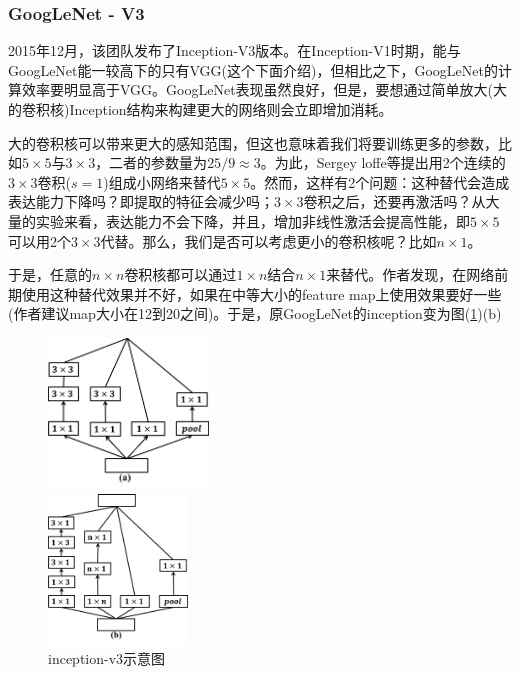        \subsubsection{GoogLeNet - V3}
            \par
            2015年12月，该团队发布了Inception-V3版本\cite{2015.Szegedy}。在Inception-V1时期，能与GoogLeNet能一较高下的只有VGG(这个下面介绍)，但相比之下，GoogLeNet的计算效率要明显高于VGG。GoogLeNet表现虽然良好，但是，要想通过简单放大(大的卷积核)Inception结构来构建更大的网络则会立即增加消耗。
            \par
            大的卷积核可以带来更大的感知范围，但这也意味着我们将要训练更多的参数，比如$5\times 5$与$3\times 3$，二者的参数量为$25/9\approx 3$。为此，Sergey loffe等提出用2个连续的$3\times 3$卷积($s=1$)组成小网络来替代$5\times 5$。然而，这样有2个问题：这种替代会造成表达能力下降吗？即提取的特征会减少吗；$3\times 3$卷积之后，还要再激活吗？从大量的实验来看，表达能力不会下降，并且，增加非线性激活会提高性能，即$5\times 5$可以用2个$3\times 3$代替。那么，我们是否可以考虑更小的卷积核呢？比如$n\times 1$。
            \par
            于是，任意的$n\times n$卷积核都可以通过$1\times n$结合$n\times 1$来替代。作者发现，在网络前期使用这种替代效果并不好，如果在中等大小的feature map上使用效果要好一些(作者建议map大小在12到20之间)。于是，原GoogLeNet的inception变为图(\ref{fig:inception-v3示意图})(b)
            \begin{figure}[H]
              \centering
              \begin{varwidth}[t]{\textwidth}
                \vspace{0pt}
                \includegraphics[height=4cm]{images/inception_v3(a).jpg}
              \end{varwidth}
              \qquad\qquad
              \begin{varwidth}[t]{\textwidth}
                \vspace{0pt}
                \includegraphics[height=4cm]{images/inception_v3(b).jpg}
              \end{varwidth}
                        \caption{inception-v3示意图}
                        \label{fig:inception-v3示意图}
            \end{figure}
